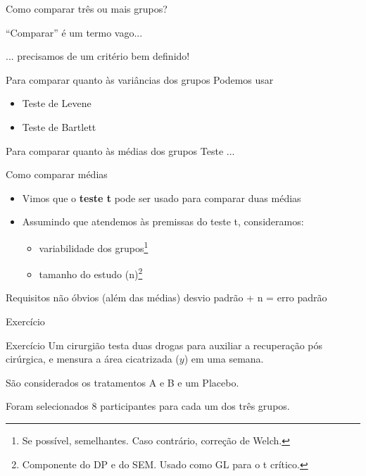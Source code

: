 \documentclass{beamer}
\begin{document}
\begin{frame}{\scriptsize Como comparar três ou mais grupos?}
  \begin{center}
    \small
    ``Comparar'' é um termo vago...

    \bigskip
    ... precisamos de um critério bem definido!
  \end{center}
  \bigskip
  \begin{block}{Para comparar quanto às variâncias dos grupos}
    \footnotesize
    Podemos usar
    \begin{itemize}
      \footnotesize
    \item Teste de Levene
    \item Teste de Bartlett
    \end{itemize}
  \end{block}
  \bigskip
  \begin{block}{Para comparar quanto às médias dos grupos}
    \footnotesize
    Teste ...
  \end{block}
\end{frame}
  
\begin{frame}[label=requisito]{\scriptsize Como comparar médias}
  \begin{itemize}
    \footnotesize
  \item Vimos que o {\bf teste t} pode ser usado para comparar duas médias
    \bigskip
  \item Assumindo que atendemos às premissas do teste t, consideramos:
    \begin{itemize}
      \footnotesize
    \item variabilidade dos grupos\footnote{\scriptsize Se possível, semelhantes. Caso contrário, correção de Welch.}
    \item tamanho do estudo (n)\footnote{\scriptsize Componente do DP e do SEM. Usado como GL para o t crítico.}
    \end{itemize}
  \end{itemize}
  \bigskip
  \begin{block}{Requisitos não óbvios (além das médias)}
    desvio padrão + n = erro padrão
  \end{block}
\end{frame}

\begin{frame}[label=exercicio-enunciado]{\scriptsize Exercício}
  \begin{exampleblock}{Exercício}
    \footnotesize
    Um cirurgião testa duas drogas para auxiliar a recuperação pós cirúrgica, e mensura a área cicatrizada ($y$) em uma semana.

    \bigskip
    São considerados os tratamentos A e B e um Placebo.

    \bigskip
    Foram selecionados 8 participantes para cada um dos três grupos.
  \end{exampleblock}
\end{frame}
\end{document}
